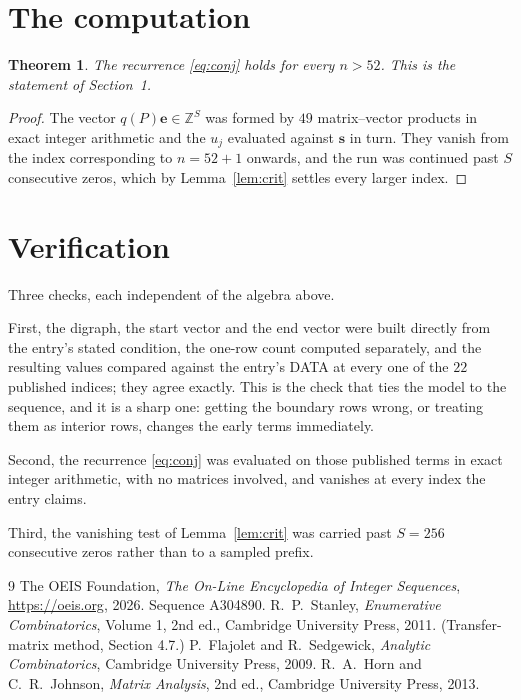 \documentclass[11pt,a4paper]{article}
\theoremstyle{plain}
\newtheorem{theorem}{Theorem}
\theoremstyle{definition}
\begin{document}
\section{The computation}

\begin{theorem}
The recurrence \eqref{eq:conj} holds for every $n>52$. This is the statement of
Section~1.
\end{theorem}

\begin{proof}
The vector $q(P)\mathbf{e}\in\mathbb{Z}^{S}$ was formed by $49$ matrix--vector
products in exact integer arithmetic and the $u_j$ evaluated against $\mathbf{s}$ in turn.
They vanish from the index corresponding to $n=52+1$ onwards, and the run was continued
past $S$ consecutive zeros, which by Lemma~\ref{lem:crit} settles every larger index.
\end{proof}

\section{Verification}

Three checks, each independent of the algebra above.

First, the digraph, the start vector and the end vector were built directly from the
entry's stated condition, the one-row count computed separately, and the resulting values
compared against the entry's DATA at every one of the $22$ published indices; they
agree exactly. This is the check that ties the model to the sequence, and it is a sharp one:
getting the boundary rows wrong, or treating them as interior rows, changes the early terms
immediately.

Second, the recurrence \eqref{eq:conj} was evaluated on those published terms in exact
integer arithmetic, with no matrices involved, and vanishes at every index the entry claims.

Third, the vanishing test of Lemma~\ref{lem:crit} was carried past $S=256$ consecutive
zeros rather than to a sampled prefix.

\begin{thebibliography}{9}
 The OEIS Foundation, \emph{The On-Line Encyclopedia of Integer
Sequences}, \url{https://oeis.org}, 2026. Sequence A304890.
 R.~P.~Stanley, \emph{Enumerative Combinatorics}, Volume 1, 2nd ed.,
Cambridge University Press, 2011. (Transfer-matrix method, Section 4.7.)
 P.~Flajolet and R.~Sedgewick, \emph{Analytic Combinatorics}, Cambridge
University Press, 2009.
 R.~A.~Horn and C.~R.~Johnson, \emph{Matrix Analysis}, 2nd ed., Cambridge
University Press, 2013.
\end{thebibliography}
\end{document}
